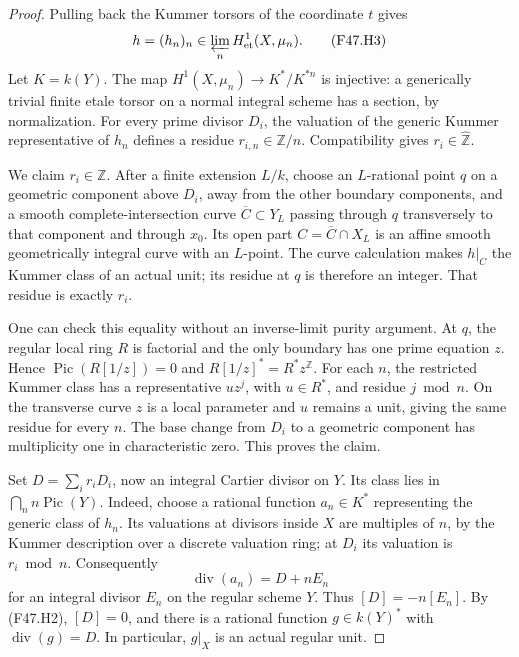 \begin{proof}
Pulling back the Kummer torsors of the coordinate $t$ gives
\[
       h=(h_n)_n\in\varprojlim_n H^1_{\mathrm{et}}(X,\mu_n).
                                                               \tag{F47.H3}
\]
Let $K=k(Y)$. The map
$H^1(X,\mu_n)\to K^*/K^{*n}$ is injective: a generically trivial
finite etale torsor on a normal integral scheme has a section, by
normalization. For every prime divisor $D_i$, the valuation of the
generic Kummer representative of $h_n$ defines a residue
$r_{i,n}\in\mathbb Z/n$. Compatibility gives
$r_i\in\widehat{\mathbb Z}$.

We claim $r_i\in\mathbb Z$. After a finite extension $L/k$, choose
an $L$-rational point $q$ on a geometric component above $D_i$, away
from the other boundary components, and a smooth complete-intersection
curve $\overline C\subset Y_L$ passing through $q$ transversely to
that component and through $x_0$. Its open part
$C=\overline C\cap X_L$ is an affine smooth geometrically integral
curve with an $L$-point. The curve calculation makes $h|_C$ the Kummer
class of an actual unit; its residue at $q$ is therefore an integer.
That residue is exactly $r_i$.

One can check this equality without an inverse-limit purity argument.
At $q$, the regular local ring $R$ is factorial and the only boundary
has one prime equation $z$. Hence
$\operatorname{Pic}(R[1/z])=0$ and
$R[1/z]^*=R^*z^{\mathbb Z}$. For each $n$, the restricted Kummer
class has a representative $u z^j$, with $u\in R^*$, and residue
$j\bmod n$. On the transverse curve $z$ is a local parameter and
$u$ remains a unit, giving the same residue for every $n$. The base
change from $D_i$ to a geometric component has multiplicity one in
characteristic zero. This proves the claim.

Set $D=\sum_i r_iD_i$, now an integral Cartier divisor on $Y$.
Its class lies in $\bigcap_n n\operatorname{Pic}(Y)$. Indeed, choose
a rational function $a_n\in K^*$ representing the generic class of
$h_n$. Its valuations at divisors inside $X$ are multiples of $n$, by
the Kummer description over a discrete valuation ring; at $D_i$ its
valuation is $r_i\bmod n$. Consequently
\[
                    \operatorname{div}(a_n)=D+nE_n
                                                               \tag{F47.H4}
\]
for an integral divisor $E_n$ on the regular scheme $Y$.
Thus $[D]=-n[E_n]$. By (F47.H2), $[D]=0$, and there is a rational
function $g\in k(Y)^*$ with $\operatorname{div}(g)=D$. In
particular, $g|_X$ is an actual regular unit.


\end{proof}
